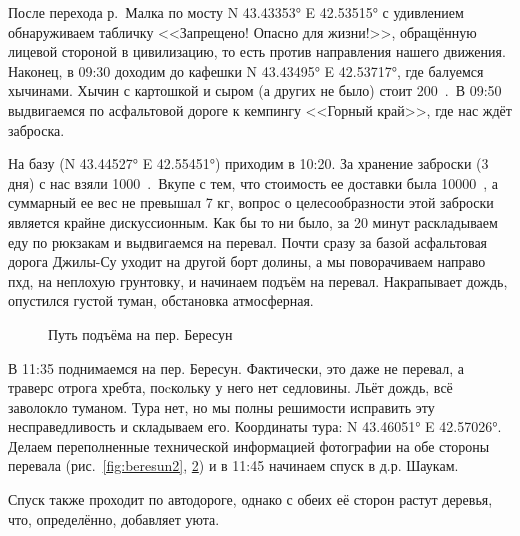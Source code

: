 После перехода р.~Малка по мосту N 43.43353° E 42.53515° с удивлением обнаруживаем табличку <<Запрещено! Опасно для жизни!>>, обращённую лицевой стороной в цивилизацию, то есть против направления нашего движения. Наконец, в 09:30 доходим до кафешки N 43.43495° E 42.53717°, где балуемся хычинами. Хычин с картошкой и сыром (а других не было) стоит 200~\faRub.~В 09:50 выдвигаемся по асфальтовой дороге к кемпингу <<Горный край>>, где нас ждёт заброска.

На базу (N 43.44527° E 42.55451°) приходим в 10:20. За хранение заброски (3 дня) с нас взяли 1000~\faRub.~Вкупе с тем, что стоимость ее доставки была 10000~\faRub, а суммарный ее вес не превышал 7 кг, вопрос о целесообразности этой заброски является крайне дискуссионным. Как бы то ни было, за 20 минут раскладываем еду по рюкзакам и выдвигаемся на перевал. Почти сразу за базой асфальтовая дорога Джилы-Су уходит на другой борт долины, а мы поворачиваем направо пхд, на неплохую грунтовку, и начинаем подъём на перевал. Накрапывает дождь, опустился густой туман, обстановка атмосферная.


\begin{figure}[h!]
	\centering
	\caption{Путь подъёма на пер. Бересун}
	\label{fig:beresun1}
\end{figure}


В 11:35 поднимаемся на пер. Бересун. Фактически, это даже не перевал, а траверс отрога хребта, поcкольку у него нет седловины. Льёт дождь, всё заволокло туманом. Тура нет, но мы полны решимости исправить эту несправедливость и складываем его. Координаты тура: N 43.46051° E 42.57026°. Делаем переполненные технической информацией фотографии на обе стороны перевала (рис.~\ref{fig:beresun2}, \ref{fig:beresun3}) и в 11:45 начинаем спуск в д.р. Шаукам.

\begin{figure}[h!]
	\centering
\begin{minipage}[t]{0.49\textwidth}
	\centering
	\label{fig:beresun2}

\end{minipage}
\hfill
\begin{minipage}[t]{0.49\textwidth}
		\centering
		\label{fig:beresun3}
	
\end{minipage}
\end{figure}
Спуск также проходит по автодороге, однако с обеих её сторон растут деревья, что, определённо, добавляет уюта. 

